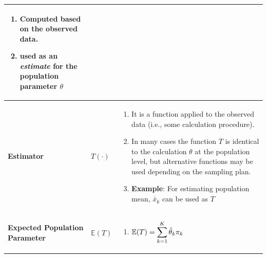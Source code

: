 \begin{customArrayStretch}{1.3}
\begin{longtable}{>{\RaggedRight\arraybackslash}p{4cm} >{\centering\arraybackslash}p{0.5cm} p{10.5cm}}
\begin{minipage}{10.3cm}
\begin{enumerate}[itemsep=0.2cm]
            \item Computed based on the observed data.
            \hfill \cite{statistics/book/Statistics-for-Data-Scientists/Maurits-Kaptein}

            \item used as an \textit{estimate} for the population parameter $\theta$
            \hfill \cite{statistics/book/Statistics-for-Data-Scientists/Maurits-Kaptein}
            
        \end{enumerate}
        \vspace{0.15cm}
    \end{minipage} 
    \\ \hline

\textbf{Estimator} &
    $T(\cdot)$ &
    \begin{minipage}{10.3cm}
        \vspace{0.15cm}
        \begin{enumerate}[itemsep=0.2cm]
            \item It is a function applied to the observed data (i.e., some calculation procedure). 
            \hfill \cite{statistics/book/Statistics-for-Data-Scientists/Maurits-Kaptein}

            \item In many cases the function $T$ is identical to the calculation $\theta$ at the population level, but alternative functions may be used depending on the sampling plan.
            \hfill \cite{statistics/book/Statistics-for-Data-Scientists/Maurits-Kaptein}

            \item \textbf{Example}: For estimating population mean, $\bar{x}_k$ can be used as $T$ 
            \hfill \cite{statistics/book/Statistics-for-Data-Scientists/Maurits-Kaptein}
        \end{enumerate}
        \vspace{0.15cm}
    \end{minipage} 
    \\ \hline

\textbf{Expected Population Parameter} &
    $\mathbb{E}(T)$ &
    \begin{minipage}{10.3cm}
        \vspace{0.15cm}
        \begin{enumerate}[itemsep=0.2cm]
            \item $
                \mathbb{E}(T)
                = \displaystyle\sum_{k=1}^{K} \hat{\theta}_k \pi_k
            $
            \hfill \cite{statistics/book/Statistics-for-Data-Scientists/Maurits-Kaptein}



\end{enumerate}
\end{minipage}
\end{longtable}
\end{customArrayStretch}
